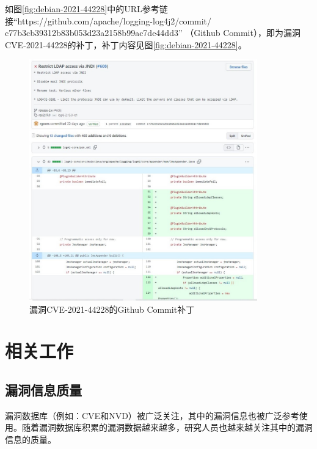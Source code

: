 如图\ref{fig:debian-2021-44228}中的URL参考链接“https://github.com/apache/logging-log4j2/commit/\\c77b3cb39312b83b053d23a2158b99ac7de44dd3” （Github Commit），即为漏洞CVE-2021-44228的补丁，补丁内容见图\ref{fig:debian-2021-44228}。

\begin{figure}[h]
    \centering
    \includegraphics[width=0.88\textwidth]{fig/commit-2021-44228}
    \caption{漏洞CVE-2021-44228的Github Commit补丁}
    \label{fig:commit-2021-44228}
\end{figure}



\section{相关工作}
\subsection{漏洞信息质量}
漏洞数据库（例如：CVE和NVD）被广泛关注，其中的漏洞信息也被广泛参考使用。随着漏洞数据库积累的漏洞数据越来越多，研究人员也越来越关注其中的漏洞信息的质量。

